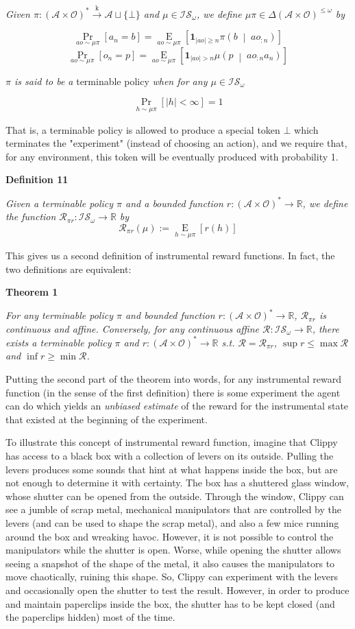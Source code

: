\documentclass[a4paper]{article}
\newcommand{\Co}[1]{}
\newcommand{\AP}[1]{\left(#1\right)}
\newcommand{\AB}[1]{\left[#1\right]}
\newcommand{\APM}[2]{\left(#1\;\middle\vert\;#2\right)}
\newcommand{\Pa}[2]{\underset{#1}{\operatorname{Pr}}\AB{#2}}
\newcommand{\Ea}[2]{\underset{#1}{\operatorname{E}}\AB{#2}}
\newcommand{\Reals}{\mathbb{R}}
\newcommand{\Abs}[1]{\left\vert #1 \right\vert}
\newcommand{\K}{\xrightarrow{\mathrm{k}}}
\newcommand{\A}{\mathcal{A}}
\newcommand{\AX}{\A\sqcup\{\bot\}}
\newcommand{\Ob}{\mathcal{O}}
\newcommand{\FH}{\AP{\A\times\Ob}^*}
\newcommand{\R}{\mathcal{R}}
\newcommand{\IS}{\mathcal{IS}}
\begin{document}
\textit{Given $\pi: \FH\K\AX$ and $\mu\in\IS_\omega$, we define $\mu\pi\in\Delta\AP{\A\times\Ob}^{\leq\omega}$ by}\Co{i}

$$\Pa{ao\sim\mu\pi}{a_n=b}=\Ea{ao\sim\mu\pi}{\boldsymbol{1}_{\Abs{ao}\geq n}\pi\APM{b}{ao_{:n}}}$$
$$\Pa{ao\sim\mu\pi}{o_n=p}=\Ea{ao\sim\mu\pi}{\boldsymbol{1}_{\Abs{ao}> n}\mu\APM{p}{ao_{:n}a_n}}$$

\textit{$\pi$ is said to be a}\Co{i} terminable policy \textit{when for any $\mu\in\IS_\omega$}\Co{i}

$$\Pa{h\sim\mu\pi}{\Abs{h}<\infty} = 1$$

That is, a terminable policy is allowed to produce a special token $\bot$ which terminates the "experiment" (instead of choosing an action), and we require that, for any environment, this token will be eventually produced with probability 1.

\textbf{Definition 11}\Co{b}

\textit{Given a terminable policy $\pi$ and a bounded function $r:\FH\rightarrow\Reals$, we define the function $\R_{\pi r}:\IS_\omega\rightarrow\Reals$ by
}\Co{i}
$$\R_{\pi r}(\mu):=\Ea{h\sim\mu\pi}{r(h)}$$

This gives us a second definition of instrumental reward functions. In fact, the two definitions are equivalent:

\textbf{Theorem 1}\Co{b}

\textit{For any terminable policy $\pi$ and bounded function $r:\FH\rightarrow\Reals$, $\R_{\pi r}$ is continuous and affine. Conversely, for any continuous affine $\R:\IS_\omega\rightarrow\Reals$, there exists a terminable policy $\pi$ and $r:\FH\rightarrow\Reals$ s.t. $\R = \R_{\pi r}$, $\sup r \leq \max\R$ and $\inf r \geq \min\R$.}\Co{i}

Putting the second part of the theorem into words, for any instrumental reward function (in the sense of the first definition) there is some experiment the agent can do which yields an \textit{unbiased estimate}\Co{i} of the reward for the instrumental state that existed at the beginning of the experiment.

To illustrate this concept of instrumental reward function, imagine that Clippy has access to a black box with a collection of levers on its outside. Pulling the levers produces some sounds that hint at what happens inside the box, but are not enough to determine it with certainty. The box has a shuttered glass window, whose shutter can be opened from the outside. Through the window, Clippy can see a jumble of scrap metal, mechanical manipulators that are controlled by the levers (and can be used to shape the scrap metal), and also a few mice running around the box and wreaking havoc. However, it is not possible to control the manipulators while the shutter is open. Worse, while opening the shutter allows seeing a snapshot of the shape of the metal, it also causes the manipulators to move chaotically, ruining this shape. So, Clippy can experiment with the levers and occasionally open the shutter to test the result. However, in order to produce and maintain paperclips inside the box, the shutter has to be kept closed (and the paperclips hidden) most of the time.
\end{document}

